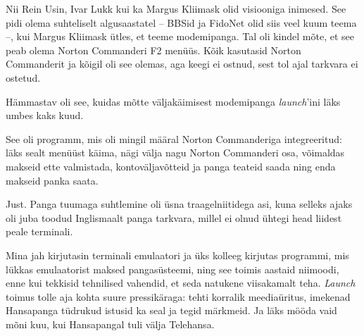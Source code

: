 Nii Rein Usin, Ivar Lukk kui ka Margus Kliimask olid 
visiooniga inimesed. See pidi olema suhteliselt algusaastatel -- BBSid ja 
FidoNet olid siis veel kuum teema --, kui Margus Kliimask ütles, et teeme 
modemipanga. Tal oli kindel mõte, et see peab olema Norton 
Commanderi F2 menüüs. Kõik kasutasid Norton Commanderit 
ja kõigil oli see olemas, aga keegi ei ostnud, sest tol ajal tarkvara ei ostetud. 


Hämmastav oli see, kuidas mõtte väljakäimisest 
modemipanga \emph{launch}'ini läks umbes kaks kuud.


See oli programm, mis oli mingil määral Norton Commanderiga integreeritud: 
läks sealt menüüst käima, nägi välja nagu Norton Commanderi 
osa, võimaldas makseid ette valmistada, kontoväljavõtteid ja panga teateid 
saada ning enda makseid panka saata.


Just. Panga tuumaga suhtlemine oli üsna traagelniitidega asi, kuna selleks 
ajaks oli juba toodud Inglismaalt panga tarkvara, millel ei olnud ühtegi head 
liidest peale terminali.


Mina jah kirjutasin terminali emulaatori ja üks kolleeg kirjutas programmi, mis 
lükkas emulaatorist maksed pangasüsteemi, ning see toimis 
aastaid niimoodi, enne kui tekkisid tehnilised vahendid, et seda 
natukene viisakamalt teha. \emph{Launch} toimus 
tolle aja kohta suure pressikäraga: tehti korralik meediaüritus, imekenad 
Hansapanga tüdrukud istusid ka seal ja tegid märkmeid. Ja läks mööda vaid
mõni kuu, kui Hansapangal tuli välja
Telehansa.

